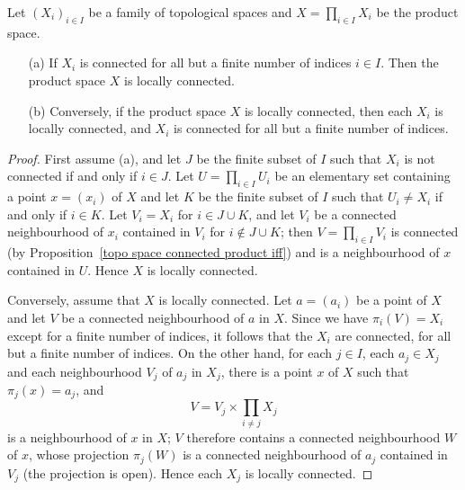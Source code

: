 \begin{proposition}
Let $(X_i)_{i\in I}$ be a family of topological spaces and $X=\prod_{i\in I}X_i$ be the product space.
\begin{itemize}
\item[(a)] If $X_i$ is connected for all but a finite number of indices $i\in I$. Then the product space $X$ is locally connected.
\item[(b)] Conversely, if the product space $X$ is locally connected, then each $X_i$ is locally connected, and $X_i$ is connected for all but a finite number of indices.
\end{itemize}
\end{proposition}
\begin{proof}
First assume (a), and let $J$ be the finite subset of $I$ such that $X_i$ is not connected if and only if $i\in J$. Let $U=\prod_{i\in I}U_i$ be an elementary set containing a point $x=(x_i)$ of $X$ and let $K$ be the finite subset of $I$ such that $U_i\neq X_i$ if and only if $i\in K$. Let $V_i=X_i$ for $i\in J\cup K$, and let $V_i$ be a connected neighbourhood of $x_i$ contained in $V_i$ for $i\notin J\cup K$; then $V=\prod_{i\in I}V_i$ is connected (by Proposition~\ref{topo space connected product iff}) and is a neighbourhood of $x$ contained in $U$. Hence $X$ is locally connected.\par
Conversely, assume that $X$ is locally connected. Let $a=(a_i)$ be a point of $X$ and let $V$ be a connected neighbourhood of $a$ in $X$. Since we have $\pi_i(V)=X_i$ except for a finite number of indices, it follows that the $X_i$ are connected, for all but a finite number of indices. On the other hand, for each $j\in I$, each $a_j\in X_j$ and each neighbourhood $V_j$ of $a_j$ in $X_j$, there is a point $x$ of $X$ such that $\pi_j(x)=a_j$, and
\[V=V_j\times\prod_{i\neq j}X_j\]
is a neighbourhood of $x$ in $X$; $V$ therefore contains a connected neighbourhood $W$ of $x$, whose projection $\pi_j(W)$ is a connected neighbourhood of $a_j$ contained in $V_j$ (the projection is open). Hence each $X_j$ is locally connected.
\end{proof}
